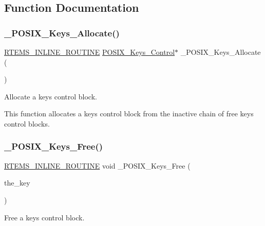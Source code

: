 \subsection{Function Documentation}
\mbox{\label{group__POSIX__KEY_ga7a110714c13632b85ff13f72031a9f0f}} 
\subsubsection{\texorpdfstring{\_POSIX\_Keys\_Allocate()}{\_POSIX\_Keys\_Allocate()}}
{\footnotesize\ttfamily \mbox{\hyperlink{group__RTEMSScoreBaseDefs_gac216239df231d5dbd15e3520b0b9313f}{R\+T\+E\+M\+S\+\_\+\+I\+N\+L\+I\+N\+E\+\_\+\+R\+O\+U\+T\+I\+NE}} \mbox{\hyperlink{structPOSIX__Keys__Control}{P\+O\+S\+I\+X\+\_\+\+Keys\+\_\+\+Control}}$\ast$ \+\_\+\+P\+O\+S\+I\+X\+\_\+\+Keys\+\_\+\+Allocate (\begin{DoxyParamCaption}\item[{void}]{ }\end{DoxyParamCaption})}



Allocate a keys control block. 

This function allocates a keys control block from the inactive chain of free keys control blocks. \mbox{\label{group__POSIX__KEY_gaca2350127d99f1a4dbc0f5e9bc012008}} 
\subsubsection{\texorpdfstring{\_POSIX\_Keys\_Free()}{\_POSIX\_Keys\_Free()}}
{\footnotesize\ttfamily \mbox{\hyperlink{group__RTEMSScoreBaseDefs_gac216239df231d5dbd15e3520b0b9313f}{R\+T\+E\+M\+S\+\_\+\+I\+N\+L\+I\+N\+E\+\_\+\+R\+O\+U\+T\+I\+NE}} void \+\_\+\+P\+O\+S\+I\+X\+\_\+\+Keys\+\_\+\+Free (\begin{DoxyParamCaption}\item[{\mbox{\hyperlink{structPOSIX__Keys__Control}{P\+O\+S\+I\+X\+\_\+\+Keys\+\_\+\+Control}} $\ast$}]{the\+\_\+key }\end{DoxyParamCaption})}



Free a keys control block. 


